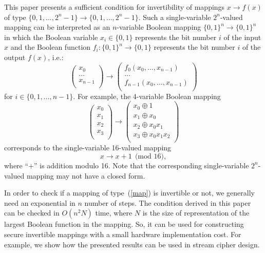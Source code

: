 \documentclass[9pt,conference]{IEEEtran} \usepackage{times}
\begin{document}
This paper presents a sufficient condition for invertibility of mappings $x \rightarrow f(x)$  of type $\{0,1,\ldots,2^n-1\} \rightarrow \{0,1,\ldots,2^n-1\}$. Such a single-variable $2^n$-valued mapping can be interpreted as an $n$-variable Boolean mapping $\{0,1\}^n \rightarrow \{0,1\}^n$  in which the Boolean variable $x_i \in \{0,1\}$ represents the bit number $i$ of the input $x$
and the Boolean function $f_i: \{0,1\}^n \rightarrow \{0,1\}$ represents the bit number $i$ of the output $f(x)$, i.e.:
\begin{equation} \label{map}
\left(
\begin{array}{c}
x_0\\
\ldots \\
x_{n-1}\\
\end{array}
\right)
\rightarrow
\left(
\begin{array}{cc}
f_0(x_0,\ldots,x_{n-1})\\
\ldots \\
f_{n-1}(x_0,\ldots,x_{n-1})\\
\end{array}
\right)
\end{equation}
for $i \in \{0,1,\ldots,n-1\}$.  
For example, the 4-variable Boolean mapping
\[
\left(
\begin{array}{c}
x_0\\
x_1\\
x_2\\
x_3\\
\end{array}
\right)
\rightarrow
\left(
\begin{array}{c}
x_0 \oplus 1\\
x_1 \oplus x_0\\
x_2 \oplus x_0 x_1\\
x_3 \oplus x_0 x_1 x_2\\
\end{array}
\right)
\]
corresponds to the single-variable 16-valued mapping 
\[
x \rightarrow x + 1 ~~\mbox{(mod 16)},
\]
where ``$+$'' is addition modulo 16.
Note that the corresponding single-variable $2^n$-valued mapping may not have a closed form.

In order to check if a mapping of type~(\ref{map}) is invertible or not, we generally need an exponential in $n$ number of steps. The condition derived in this paper can be checked in $O(n^2 N)$ time,
where $N$ is the size of representation of the largest Boolean function in the mapping.
So, it can be used for constructing secure invertible mappings
with a small hardware implementation cost. For example, we show how the presented results can be used in
stream cipher design.
\end{document}
